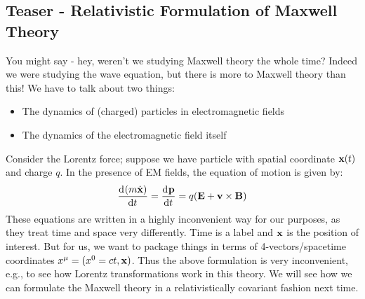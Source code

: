 \subsection{Teaser - Relativistic Formulation of Maxwell Theory}
You might say - hey, weren't we studying Maxwell theory the whole time? Indeed we were studying the wave equation, but there is more to Maxwell theory than this! We have to talk about two things:
\begin{itemize}
    \item The dynamics of (charged) particles in electromagnetic fields
    \item The dynamics of the electromagnetic field itself
\end{itemize}

Consider the Lorentz force; suppose we have particle with spatial coordinate $\mathbf{x}(t)$ and charge $q$. In the presence of EM fields, the equation of motion is given by:
\begin{equation}
    \dod{(m\dot{\v{x}})}{t} = \dod{\v{p}}{t} = q(\v{E} + \v{v}\times\v{B})
\end{equation}
These equations are written in a highly inconvenient way for our purposes, as they treat time and space very differently. Time is a label and $\mathbf{x}$ is the position of interest. But for us, we want to package things in terms of 4-vectors/spacetime coordinates $x^\mu = (x^0 = ct, \mathbf{x})$. Thus the above formulation is very inconvenient, e.g., to see how Lorentz transformations work in this theory. We will see how we can formulate the Maxwell theory in a relativistically covariant fashion next time.